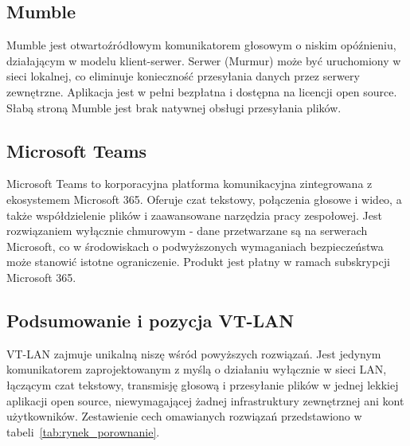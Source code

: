 \subsection*{Mumble}

Mumble \cite{Mumble} jest otwartoźródłowym komunikatorem głosowym
o niskim opóźnieniu, działającym w modelu klient-serwer. Serwer (Murmur)
może być uruchomiony w sieci lokalnej, co eliminuje konieczność przesyłania
danych przez serwery zewnętrzne. Aplikacja jest w pełni bezpłatna i dostępna na licencji
open source. Słabą stroną Mumble jest brak natywnej obsługi przesyłania plików.

\subsection*{Microsoft Teams}

Microsoft Teams to korporacyjna platforma komunikacyjna zintegrowana
z ekosystemem Microsoft 365. Oferuje czat tekstowy, połączenia głosowe
i wideo, a także współdzielenie plików i zaawansowane narzędzia pracy
zespołowej. Jest rozwiązaniem wyłącznie chmurowym - dane przetwarzane są
na serwerach Microsoft, co w środowiskach o podwyższonych wymaganiach
bezpieczeństwa może stanowić istotne ograniczenie. Produkt jest płatny
w ramach subskrypcji Microsoft 365.

\subsection*{Podsumowanie i pozycja VT-LAN}
VT-LAN zajmuje unikalną niszę wśród powyższych rozwiązań. Jest jedynym
komunikatorem zaprojektowanym z myślą o działaniu wyłącznie w sieci LAN,
łączącym czat tekstowy, transmisję głosową i przesyłanie plików w jednej
lekkiej aplikacji open source, niewymagającej żadnej infrastruktury
zewnętrznej ani kont użytkowników. Zestawienie cech omawianych rozwiązań
przedstawiono w tabeli~\ref{tab:rynek_porownanie}.

